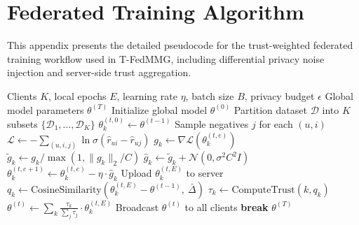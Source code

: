 \documentclass[12pt,a4paper]{report}
\begin{document}
{%
\chapter{Federated Training Algorithm}
\label{appendix:algorithm}

This appendix presents the detailed pseudocode for the trust-weighted federated training workflow used in T-FedMMG, including differential privacy noise injection and server-side trust aggregation.

\begin{algorithm}[htbp]
\caption{Federated Training Workflow for T-FedMMG}
\label{alg:federated_training}
\begin{algorithmic}[1]
\REQUIRE Clients $K$, local epochs $E$, learning rate $\eta$, batch size $B$, privacy budget $\epsilon$
\ENSURE Global model parameters $\theta^{(T)}$
\STATE Initialize global model $\theta^{(0)}$
\STATE Partition dataset $\mathcal{D}$ into $K$ subsets $\{\mathcal{D}_1, \ldots, \mathcal{D}_K\}$
        \STATE $\theta_k^{(t,0)} \leftarrow \theta^{(t-1)}$ 
                \STATE Sample negatives $j$ for each $(u,i)$
                \STATE $\mathcal{L} \leftarrow -\sum_{(u,i,j)} \ln \sigma(\hat{r}_{ui} - \hat{r}_{uj})$ 
                \STATE $g_k \leftarrow \nabla \mathcal{L}(\theta_k^{(t,e)})$
                \STATE $\tilde{g}_k \leftarrow g_k / \max(1, \|g_k\|_2 / C)$ 
                \STATE $\hat{g}_k \leftarrow \tilde{g}_k + \mathcal{N}(0, \sigma^2 C^2 I)$ 
                \STATE $\theta_k^{(t,e+1)} \leftarrow \theta_k^{(t,e)} - \eta \cdot \hat{g}_k$
            \ENDFOR
        \ENDFOR
        \STATE Upload $\theta_k^{(t,E)}$ to server
    \ENDFOR
    \STATE {}
        \STATE $q_k \leftarrow \text{CosineSimilarity}(\theta_k^{(t,E)} - \theta^{(t-1)},\ \bar{\Delta})$ 
        \STATE $\tau_k \leftarrow \text{ComputeTrust}(k, q_k)$ 
    \ENDFOR
    \STATE $\theta^{(t)} \leftarrow \sum_{k} \frac{\tau_k}{\sum_j \tau_j} \cdot \theta_k^{(t,E)}$ 
    \STATE Broadcast $\theta^{(t)}$ to all clients
        \STATE \textbf{break}
    \ENDIF
\ENDFOR
\RETURN $\theta^{(T)}$
\end{algorithmic}
\end{algorithm}

}
\end{document}
